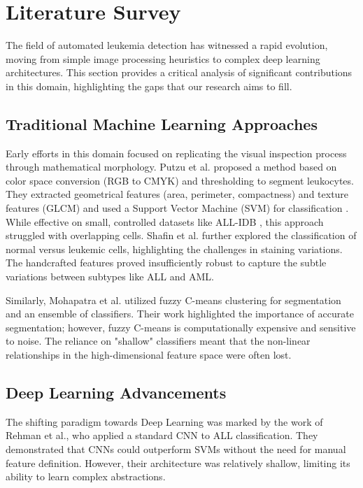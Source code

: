 \documentclass[journal]{IEEEtran}
\begin{document}
\section{Literature Survey}

The field of automated leukemia detection has witnessed a rapid evolution, moving from simple image processing heuristics to complex deep learning architectures. This section provides a critical analysis of significant contributions in this domain, highlighting the gaps that our research aims to fill.

\subsection{Traditional Machine Learning Approaches}
Early efforts in this domain focused on replicating the visual inspection process through mathematical morphology. Putzu et al. proposed a method based on color space conversion (RGB to CMYK) and thresholding to segment leukocytes. They extracted geometrical features (area, perimeter, compactness) and texture features (GLCM) and used a Support Vector Machine (SVM) for classification \cite{r7}. While effective on small, controlled datasets like ALL-IDB \cite{r7}, this approach struggled with overlapping cells. Shafin et al. \cite{r8} further explored the classification of normal versus leukemic cells, highlighting the challenges in staining variations. The handcrafted features proved insufficiently robust to capture the subtle variations between subtypes like ALL and AML.

Similarly, Mohapatra et al. utilized fuzzy C-means clustering for segmentation and an ensemble of classifiers. Their work highlighted the importance of accurate segmentation; however, fuzzy C-means is computationally expensive and sensitive to noise. The reliance on "shallow" classifiers meant that the non-linear relationships in the high-dimensional feature space were often lost.

\subsection{Deep Learning Advancements}
The shifting paradigm towards Deep Learning was marked by the work of Rehman et al., who applied a standard CNN to ALL classification. They demonstrated that CNNs could outperform SVMs without the need for manual feature definition. However, their architecture was relatively shallow, limiting its ability to learn complex abstractions.
\end{document}
